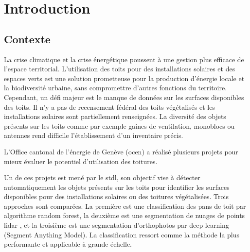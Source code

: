 
\chapter{Introduction}
\label{chap:introduction}

\section{Contexte}

\par{La crise climatique \cite{lee_ipcc_2023} et la crise énergétique poussent à une gestion plus efficace de l'espace territorial. L'utilisation des toits pour des installations solaires et des espaces verts est une solution prometteuse pour la production d'énergie locale et la biodiversité urbaine, sans compromettre d'autres fonctions du territoire. Cependant, un défi majeur est le manque de données sur les surfaces disponibles des toits. Il n'y a pas de recensement fédéral des toits végétalisés et les installations solaires sont partiellement renseignées. La diversité des objets présents sur les toits comme par exemple gaines de ventilation, monoblocs ou antennes rend difficile l'établissement d'un inventaire précis.}

\par{L'Office cantonal de l'énergie de Genève (\acrshort{ocen}) a réalisé plusieurs projets pour mieux évaluer le potentiel d’utilisation des toitures.}

\par{Un de ces projets \cite{herny_detection_2024} est mené par le \gls{stdl}, son objectif vise à détecter automatiquement les objets présents sur les toits pour identifier les surfaces disponibles pour des installations solaires ou des toitures végétalisées. Trois approches sont comparées. La première est une classification des pans de toit par algorithme random forest, la deuxième est une segmentation de nuages de points \gls{lidar} , et la troisième est une segmentation d'orthophotos par deep learning (Segment Anything Model). La classification ressort comme la méthode la plus performante et applicable à grande échelle.}


